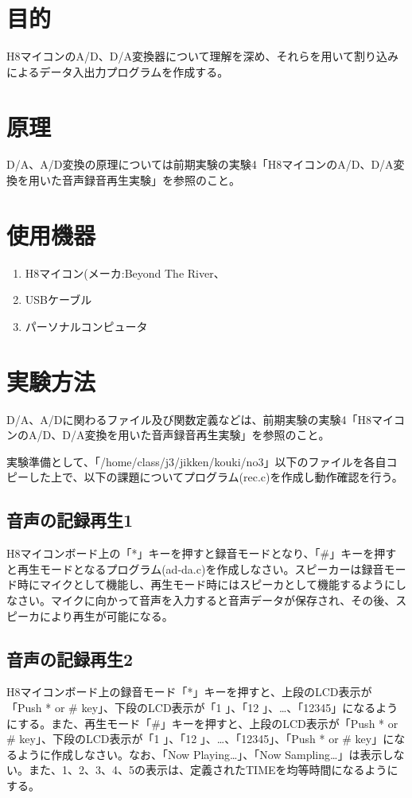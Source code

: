 \documentclass{jarticle}
\begin{document}
\section{目的}
H8マイコンのA/D、D/A変換器について理解を深め、それらを用いて割り込みによるデータ入出力プログラムを作成する。

\section{原理}
D/A、A/D変換の原理については前期実験の実験4「H8マイコンのA/D、D/A変換を用いた音声録音再生実験」を参照のこと。

\section{使用機器}
\begin{enumerate}
\item H8マイコン(メーカ:Beyond The River、
\item USBケーブル
\item パーソナルコンピュータ
\end{enumerate}

\section{実験方法}
D/A、A/Dに関わるファイル及び関数定義などは、前期実験の実験4「H8マイコンのA/D、D/A変換を用いた音声録音再生実験」を参照のこと。

実験準備として、「/home/class/j3/jikken/kouki/no3」以下のファイルを各自コピーした上で、以下の課題についてプログラム(rec.c)を作成し動作確認を行う。

\subsection{音声の記録再生1}
H8マイコンボード上の「*」キーを押すと録音モードとなり、「#」キーを押すと再生モードとなるプログラム(ad-da.c)を作成しなさい。スピーカーは録音モード時にマイクとして機能し、再生モード時にはスピーカとして機能するようにしなさい。マイクに向かって音声を入力すると音声データが保存され、その後、スピーカにより再生が可能になる。

\subsection{音声の記録再生2}
H8マイコンボード上の録音モード「*」キーを押すと、上段のLCD表示が「Push * or # key」、下段のLCD表示が「1    」、「12  」、…、「12345」になるようにする。また、再生モード「#」キーを押すと、上段のLCD表示が「Push * or # key」、下段のLCD表示が「1    」、「12  」、…、「12345」、「Push * or # key」になるように作成しなさい。なお、「Now Playing…」、「Now Sampling…」は表示しない。また、1、2、3、4、5の表示は、定義されたTIMEを均等時間になるようにする。
\end{document}
